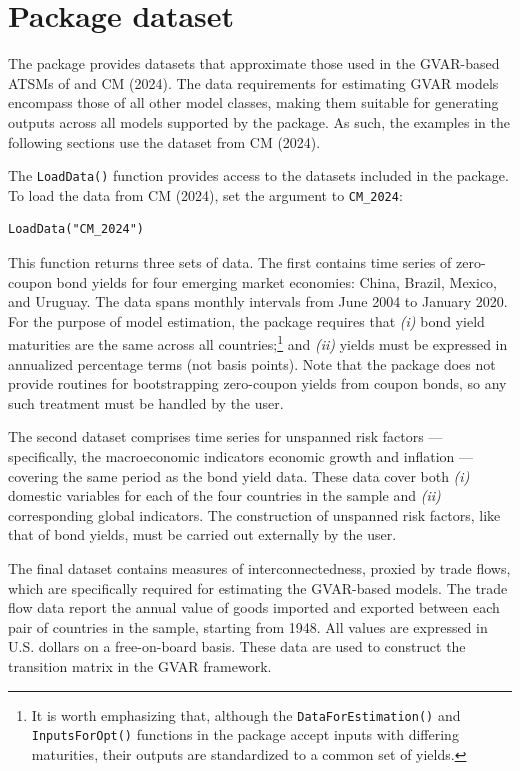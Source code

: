 \section{Package dataset}\label{S:SectionData}

The  package provides datasets that approximate those used in the GVAR-based ATSMs of \citet{CandelonMoura2023} and CM (2024). The data requirements for estimating GVAR models encompass those of all other model classes, making them suitable for generating outputs across all models supported by the package. As such, the examples in the following sections use the dataset from CM (2024).

The \texttt{LoadData()} function provides access to the datasets included in the package. To load the data from CM (2024), set the argument to \texttt{CM\_2024}:

\begin{verbatim}
LoadData("CM_2024")
\end{verbatim}

This function returns three sets of data. The first contains time series of zero-coupon bond yields for four emerging market economies: China, Brazil, Mexico, and Uruguay. The data spans monthly intervals from June 2004 to January 2020. For the purpose of model estimation, the package requires that \emph{(i)} bond yield maturities are the same across all countries;\footnote{It is worth emphasizing that, although the \texttt{DataForEstimation()} and \texttt{InputsForOpt()} functions in the package accept inputs with differing maturities, their outputs are standardized to a common set of yields.} and \emph{(ii)} yields must be expressed in annualized percentage terms (not basis points). Note that the  package does not provide routines for bootstrapping zero-coupon yields from coupon bonds, so any such treatment must be handled by the user.

The second dataset comprises time series for unspanned risk factors --- specifically, the macroeconomic indicators economic growth and inflation --- covering the same period as the bond yield data. These data cover both \emph{(i)} domestic variables for each of the four countries in the sample and \emph{(ii)} corresponding global indicators. The construction of unspanned risk factors, like that of bond yields, must be carried out externally by the user.

The final dataset contains measures of interconnectedness, proxied by trade flows, which are specifically required for estimating the GVAR-based models. The trade flow data report the annual value of goods imported and exported between each pair of countries in the sample, starting from 1948. All values are expressed in U.S. dollars on a free-on-board basis. These data are used to construct the transition matrix in the GVAR framework.

